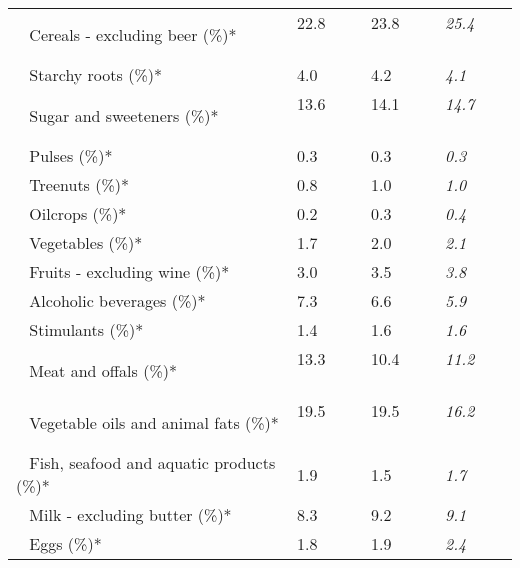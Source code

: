 \begin{tabular}{L{3.9cm} R{1cm} R{1cm} R{1cm}}
	 ~ Cereals - excluding beer (\%)* & 22.8 ~ \ \ & 23.8 ~ \ \ & \textit{25.4} ~ \ \ \\ 
	 ~ Starchy roots (\%)* & 4.0 ~ \ \ & 4.2 ~ \ \ & \textit{4.1} ~ \ \ \\ 
	 ~ Sugar and sweeteners (\%)* & 13.6 ~ \ \ & 14.1 ~ \ \ & \textit{14.7} ~ \ \ \\ 
	 ~ Pulses (\%)* & 0.3 ~ \ \ & 0.3 ~ \ \ & \textit{0.3} ~ \ \ \\ 
	 ~ Treenuts (\%)* & 0.8 ~ \ \ & 1.0 ~ \ \ & \textit{1.0} ~ \ \ \\ 
	 ~ Oilcrops (\%)* & 0.2 ~ \ \ & 0.3 ~ \ \ & \textit{0.4} ~ \ \ \\ 
	 ~ Vegetables (\%)* & 1.7 ~ \ \ & 2.0 ~ \ \ & \textit{2.1} ~ \ \ \\ 
	 ~ Fruits - excluding wine (\%)* & 3.0 ~ \ \ & 3.5 ~ \ \ & \textit{3.8} ~ \ \ \\ 
	 ~ Alcoholic beverages (\%)* & 7.3 ~ \ \ & 6.6 ~ \ \ & \textit{5.9} ~ \ \ \\ 
	 ~ Stimulants (\%)* & 1.4 ~ \ \ & 1.6 ~ \ \ & \textit{1.6} ~ \ \ \\ 
	 ~ Meat and offals (\%)* & 13.3 ~ \ \ & 10.4 ~ \ \ & \textit{11.2} ~ \ \ \\ 
	 ~ Vegetable oils and animal fats (\%)* & 19.5 ~ \ \ & 19.5 ~ \ \ & \textit{16.2} ~ \ \ \\ 
	 ~ Fish, seafood and aquatic products (\%)* & 1.9 ~ \ \ & 1.5 ~ \ \ & \textit{1.7} ~ \ \ \\ 
	 ~ Milk - excluding butter (\%)* & 8.3 ~ \ \ & 9.2 ~ \ \ & \textit{9.1} ~ \ \ \\ 
	 ~ Eggs (\%)* & 1.8 ~ \ \ & 1.9 ~ \ \ & \textit{2.4} ~ \ \ \\ 
       \toprule
      \end{tabular}
      \clearpage
{}
